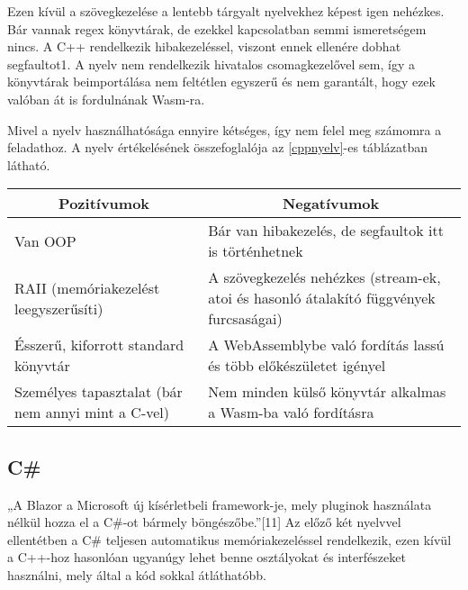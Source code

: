 Ezen kívül a szövegkezelése a lentebb tárgyalt nyelvekhez képest igen nehézkes. Bár vannak regex könyvtárak, de ezekkel kapcsolatban semmi ismeretségem nincs. A C++ rendelkezik hibakezeléssel, viszont ennek ellenére dobhat segfaultot1. A nyelv nem rendelkezik hivatalos csomagkezelővel sem, így a könyvtárak beimportálása nem feltétlen egyszerű és nem garantált, hogy ezek valóban át is fordulnának Wasm-ra.

Mivel a nyelv használhatósága ennyire kétséges, így nem felel meg számomra a feladathoz. A nyelv értékelésének összefoglalója az \ref{cppnyelv}-es táblázatban látható.

\begin{center}
  \begin{tabularx}{\textwidth}{X X}
    \hline
    \multicolumn{1}{c}{\bfseries{Pozitívumok}}         & \multicolumn{1}{c}{\bfseries{Negatívumok}}                                             \\
    \hline
    Van OOP                                            & Bár van hibakezelés, de segfaultok itt is történhetnek                                 \\
    RAII (memóriakezelést leegyszerűsíti)              & A szövegkezelés nehézkes (stream-ek, atoi és hasonló átalakító függvények furcsaságai) \\
    Ésszerű, kiforrott standard könyvtár               & A WebAssemblybe való fordítás lassú és több előkészületet igényel                      \\
    Személyes tapasztalat (bár nem annyi mint a C-vel) & Nem minden külső könyvtár alkalmas a Wasm-ba való fordításra                           \\
    \hline
  \end{tabularx}
\end{center}

\newpage

\subsection{C\#}

„A Blazor a Microsoft új kísérletbeli framework-je, mely pluginok használata nélkül hozza el a C\#-ot bármely böngészőbe.”[11] Az előző két nyelvvel ellentétben a C\# teljesen automatikus memóriakezeléssel rendelkezik, ezen kívül a C++-hoz hasonlóan ugyanúgy lehet benne osztályokat és interfészeket használni, mely által a kód sokkal átláthatóbb.

